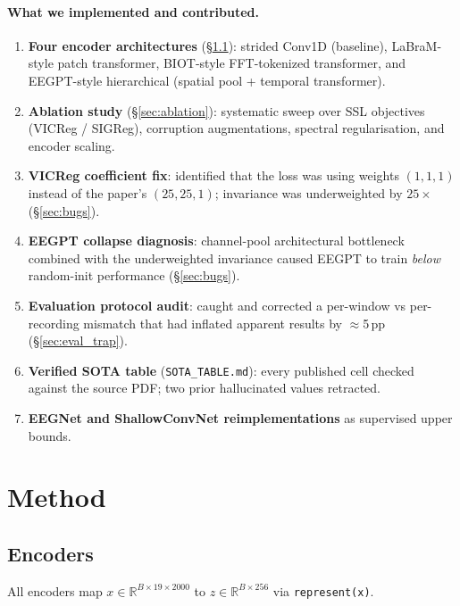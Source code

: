 \documentclass[10pt,a4paper]{article}
\begin{document}
\paragraph{What we implemented and contributed.}
\begin{enumerate}
  \item \textbf{Four encoder architectures} (\S\ref{sec:encoders}): strided Conv1D (baseline),
    LaBraM-style patch transformer, BIOT-style FFT-tokenized transformer, and
    EEGPT-style hierarchical (spatial pool + temporal transformer).
  \item \textbf{Ablation study} (\S\ref{sec:ablation}): systematic sweep over SSL objectives
    (VICReg / SIGReg), corruption augmentations, spectral regularisation, and encoder scaling.
  \item \textbf{VICReg coefficient fix}: identified that the loss was using weights $(1,1,1)$
    instead of the paper's $(25,25,1)$; invariance was underweighted by $25\times$
    (\S\ref{sec:bugs}).
  \item \textbf{EEGPT collapse diagnosis}: channel-pool architectural bottleneck combined with
    the underweighted invariance caused EEGPT to train \emph{below} random-init performance
    (\S\ref{sec:bugs}).
  \item \textbf{Evaluation protocol audit}: caught and corrected a per-window vs per-recording
    mismatch that had inflated apparent results by $\approx$5\,pp (\S\ref{sec:eval_trap}).
  \item \textbf{Verified SOTA table} (\texttt{SOTA\_TABLE.md}): every published cell checked
    against the source PDF; two prior hallucinated values retracted.
  \item \textbf{EEGNet and ShallowConvNet reimplementations} as supervised upper bounds.
\end{enumerate}

\section{Method}

\subsection{Encoders}\label{sec:encoders}
All encoders map $x \in \mathbb{R}^{B \times 19 \times 2000}$ to
$z \in \mathbb{R}^{B \times 256}$ via \texttt{represent(x)}.
\end{document}
